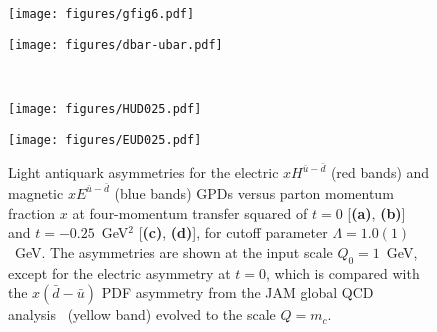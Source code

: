 \documentclass[preprintnumbers,prd,superscriptaddress,preprint]{revtex4-1}
\begin{document}
\begin{figure}[htbp] %
\begin{minipage}[b]{.45\linewidth}
\hspace*{-0.3cm}\texttt{[image: figures/gfig6.pdf]}   
 \vspace{0pt}
\end{minipage}
\hfill
\begin{minipage}[b]{.45\linewidth}   
\hspace*{-0.95cm} \texttt{[image: figures/dbar-ubar.pdf]} 
   \vspace{0pt}
\end{minipage}  
\\[-0.4cm]
\begin{minipage}[t]{.45\linewidth}
\hspace*{-0.5cm}\texttt{[image: figures/HUD025.pdf]}   
 \vspace{0pt}
\end{minipage}
\hfill
\begin{minipage}[t]{.45\linewidth}   
\hspace*{-0.85cm} \texttt{[image: figures/EUD025.pdf]}  
   \vspace{-12pt}
\end{minipage} 
\caption{Light antiquark asymmetries for the electric $xH^{\bar{u}-\bar{d}}$ (red bands) and magnetic $xE^{\bar{u}-\bar{d}}$ (blue bands) GPDs versus parton momentum fraction $x$ at four-momentum transfer squared of $t=0$ [{\bf (a)}, {\bf (b)}] and $t=-0.25$~GeV$^2$ [{\bf (c)}, {\bf (d)}], for cutoff parameter $\Lambda = 1.0(1)$~GeV. The asymmetries are shown at the input scale $Q_0=1$~GeV, except for the electric asymmetry at $t=0$, which is compared with the $x(\bar d-\bar u)$ PDF asymmetry from the JAM global QCD analysis~\cite{Cocuzza:2021cbi} (yellow band) evolved to the scale $Q=m_c$.}
\label{2du-dt0}
\end{figure}
\end{document}
